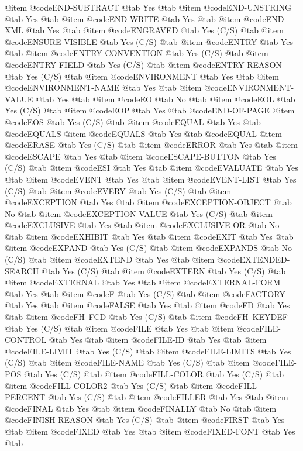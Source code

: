 @item @code{END-SUBTRACT} @tab Yes @tab 
@item @code{END-UNSTRING} @tab Yes @tab 
@item @code{END-WRITE} @tab Yes @tab 
@item @code{END-XML} @tab Yes @tab 
@item @code{ENGRAVED} @tab Yes	(C/S) @tab 
@item @code{ENSURE-VISIBLE} @tab Yes	(C/S) @tab 
@item @code{ENTRY} @tab Yes @tab 
@item @code{ENTRY-CONVENTION} @tab Yes	(C/S) @tab 
@item @code{ENTRY-FIELD} @tab Yes	(C/S) @tab 
@item @code{ENTRY-REASON} @tab Yes	(C/S) @tab 
@item @code{ENVIRONMENT} @tab Yes @tab 
@item @code{ENVIRONMENT-NAME} @tab Yes @tab 
@item @code{ENVIRONMENT-VALUE} @tab Yes @tab 
@item @code{EO} @tab No @tab 
@item @code{EOL} @tab Yes	(C/S) @tab 
@item @code{EOP} @tab Yes @tab @code{END-OF-PAGE}
@item @code{EOS} @tab Yes	(C/S) @tab 
@item @code{EQUAL} @tab Yes @tab @code{EQUALS}
@item @code{EQUALS} @tab Yes @tab @code{EQUAL}
@item @code{ERASE} @tab Yes	(C/S) @tab 
@item @code{ERROR} @tab Yes @tab 
@item @code{ESCAPE} @tab Yes @tab 
@item @code{ESCAPE-BUTTON} @tab Yes	(C/S) @tab 
@item @code{ESI} @tab Yes @tab 
@item @code{EVALUATE} @tab Yes @tab 
@item @code{EVENT} @tab Yes @tab 
@item @code{EVENT-LIST} @tab Yes	(C/S) @tab 
@item @code{EVERY} @tab Yes	(C/S) @tab 
@item @code{EXCEPTION} @tab Yes @tab 
@item @code{EXCEPTION-OBJECT} @tab No @tab 
@item @code{EXCEPTION-VALUE} @tab Yes	(C/S) @tab 
@item @code{EXCLUSIVE} @tab Yes @tab 
@item @code{EXCLUSIVE-OR} @tab No @tab 
@item @code{EXHIBIT} @tab Yes @tab 
@item @code{EXIT} @tab Yes @tab 
@item @code{EXPAND} @tab Yes	(C/S) @tab 
@item @code{EXPANDS} @tab No	(C/S) @tab 
@item @code{EXTEND} @tab Yes @tab 
@item @code{EXTENDED-SEARCH} @tab Yes	(C/S) @tab 
@item @code{EXTERN} @tab Yes	(C/S) @tab 
@item @code{EXTERNAL} @tab Yes @tab 
@item @code{EXTERNAL-FORM} @tab Yes @tab 
@item @code{F} @tab Yes	(C/S) @tab 
@item @code{FACTORY} @tab Yes @tab 
@item @code{FALSE} @tab Yes @tab 
@item @code{FD} @tab Yes @tab 
@item @code{FH--FCD} @tab Yes	(C/S) @tab 
@item @code{FH--KEYDEF} @tab Yes	(C/S) @tab 
@item @code{FILE} @tab Yes @tab 
@item @code{FILE-CONTROL} @tab Yes @tab 
@item @code{FILE-ID} @tab Yes @tab 
@item @code{FILE-LIMIT} @tab Yes	(C/S) @tab 
@item @code{FILE-LIMITS} @tab Yes	(C/S) @tab 
@item @code{FILE-NAME} @tab Yes	(C/S) @tab 
@item @code{FILE-POS} @tab Yes	(C/S) @tab 
@item @code{FILL-COLOR} @tab Yes	(C/S) @tab 
@item @code{FILL-COLOR2} @tab Yes	(C/S) @tab 
@item @code{FILL-PERCENT} @tab Yes	(C/S) @tab 
@item @code{FILLER} @tab Yes @tab 
@item @code{FINAL} @tab Yes @tab 
@item @code{FINALLY} @tab No @tab 
@item @code{FINISH-REASON} @tab Yes	(C/S) @tab 
@item @code{FIRST} @tab Yes @tab 
@item @code{FIXED} @tab Yes @tab 
@item @code{FIXED-FONT} @tab Yes @tab 
